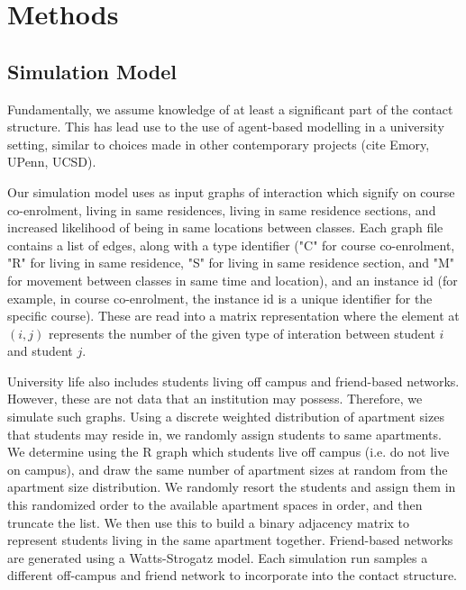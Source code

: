 \documentclass[fleqn,10pt]{SelfArx} %
\newcommand{\ed}[1]{{\color{blue} #1}}
\begin{document}


\section{Methods}

\subsection{Simulation Model}

Fundamentally, we assume knowledge of at least a significant part of the contact structure.  This has lead use to the use of agent-based modelling in a university setting, similar to choices made in other contemporary projects (cite Emory, UPenn, UCSD).  

Our simulation model uses as input graphs of interaction which signify on course co-enrolment, living in same residences, living in same residence sections, and increased likelihood of being in same locations between classes.  Each graph file contains a list of edges, along with a type identifier ("C" for course co-enrolment, "R" for living in same residence, "S" for living in same residence section, and "M" for movement between classes in same time and location), and an instance id (for example, in course co-enrolment, the instance id is a unique identifier for the specific course).  These are read into a matrix representation where the element at $(i,j)$ represents the number of the given type of interation between student $i$ and student $j$.

University life also includes students living off campus and friend-based networks.  However, these are not data that an institution may possess.  Therefore, we simulate such graphs.  Using a discrete weighted distribution of apartment sizes that students may reside in, we randomly assign students to same apartments.  We determine using the R graph which students live off campus (i.e. do not live on campus), and draw the same number of apartment sizes at random from the apartment size distribution.  We randomly resort the students and assign them in this randomized order to the available apartment spaces in order, and then truncate the list.  We then use this to build a binary adjacency matrix to represent students living in the same apartment together. Friend-based networks are generated using a Watts-Strogatz model\cite{watts_collective_1998,schnettler_structured_2009,amblard_which_2015}.  Each simulation run samples a different off-campus and friend network to incorporate into the contact structure.  
\end{document}
